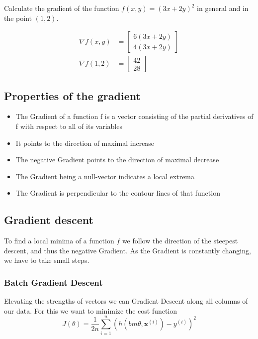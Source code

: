 \documentclass[a4paper, 11pt]{article}
\begin{document}
Calculate the gradient of the function $f(x,y) = (3x+2y)^2$ in general and in the point $(1,2)$.

\begin{align*}
	\nabla f(x,y) &= \begin{bmatrix}
	6(3x + 2y)\\
	4(3x + 2y)
	\end{bmatrix}\\
	\nabla f(1,2) &= \begin{bmatrix}
	42\\
	28
	\end{bmatrix}
\end{align*}

\subsection{Properties of the gradient}
\begin{itemize}
	\item The Gradient of a function f is a vector consisting of the partial derivatives of f with respect to all of its variables
	\item It points to the direction of maximal increase
	\item The negative Gradient points to the direction of maximal decrease
	\item The Gradient being a null-vector indicates a local extrema
	\item The Gradient is perpendicular to the contour lines of that function
\end{itemize}

\subsection{Gradient descent}
To find a local minima of a function $f$ we follow the direction of the steepest descent, and thus the negative Gradient. As the Gradient is constantly changing, we have to take small steps.

\subsubsection{Batch Gradient Descent}
Elevating the strengths of vectors we can Gradient Descent along all columns of our data. For this we want to minimize the cost function
\begin{equation}
	J(\theta) = \frac{1}{2n}\sum_{i=1}^{n}(h(bm{\theta},\textbf{x}^{(i)})-y^{(i)})^2
\end{equation}
\end{document}
